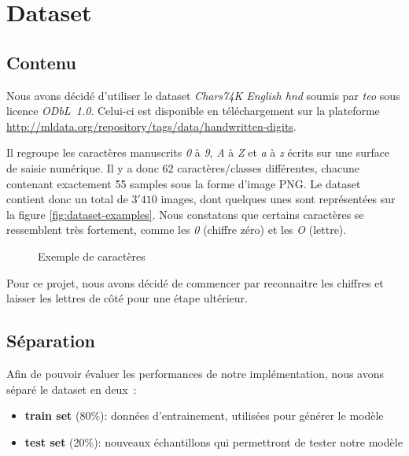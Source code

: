 
\chapter{Dataset}

\section{Contenu}

Nous avons décidé d'utiliser le dataset \emph{Chars74K English hnd} soumis par \emph{teo} sous licence \emph{ODbL~1.0}. Celui-ci est disponible en téléchargement sur la plateforme \url{http://mldata.org/repository/tags/data/handwritten-digits}.

Il regroupe les caractères manuscrits \emph{0} à \emph{9}, \emph{A} à \emph{Z} et \emph{a} à \emph{z} écrits sur une surface de saisie numérique. Il y a donc 62 caractères/classes différentes, chacune contenant exactement 55 samples sous la forme d'image PNG. Le dataset contient donc un total de $3'410$ images, dont quelques unes sont représentées sur la figure \vref{fig:dataset-examples}. Nous constatons que certains caractères se ressemblent très fortement, comme les \emph{0} (chiffre zéro) et les \emph{O} (lettre).

\begin{figure}[h]
\caption{Exemple de caractères}
\label{fig:dataset-examples}
\end{figure}

Pour ce projet, nous avons décidé de commencer par reconnaitre les chiffres et laisser les lettres de côté pour une étape ultérieur.


\section{Séparation}

Afin de pouvoir évaluer les performances de notre implémentation, nous avons séparé le dataset en deux~:
\begin{itemize}
\item \textbf{train set} (80\%): données d'entrainement, utilisées pour générer le modèle
\item \textbf{test set} (20\%): nouveaux échantillons qui permettront de tester notre modèle
\end{itemize} 

